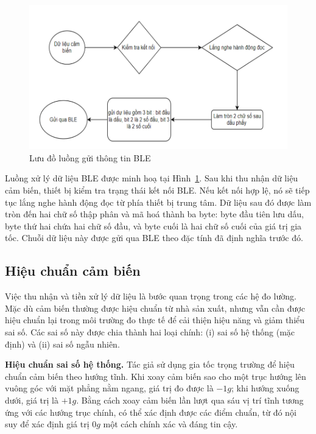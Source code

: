 \begin{figure}[htbp]
    \centering
    \includegraphics[width=\textwidth]{images/sendBleFlow.png}
    \caption{Lưu đồ luồng gửi thông tin BLE}
    \label{sendBleFlow}
\end{figure}


Luồng xử lý dữ liệu BLE được minh hoạ tại Hình~\ref{sendBleFlow}. 
Sau khi thu nhận dữ liệu cảm biến, thiết bị kiểm tra trạng thái 
kết nối BLE. Nếu kết nối hợp lệ, nó sẽ tiếp tục lắng nghe hành động đọc 
từ phía thiết bị trung tâm. Dữ liệu sau đó được làm tròn đến hai chữ số 
thập phân và mã hoá thành ba byte: byte đầu tiên lưu dấu, byte thứ hai 
chứa hai chữ số đầu, và byte cuối là hai chữ số cuối của giá trị gia tốc. 
Chuỗi dữ liệu này được gửi qua BLE theo đặc tính đã định nghĩa trước đó.














\subsection{Hiệu chuẩn cảm biến}
Việc thu nhận và tiền xử lý dữ liệu là bước quan trọng trong các hệ đo 
lường. Mặc dù cảm biến thường được hiệu chuẩn từ nhà sản xuất, nhưng 
vẫn cần được hiệu chuẩn lại trong môi trường đo thực tế để cải thiện 
hiệu năng và giảm thiểu sai số. Các sai số này được chia thành hai 
loại chính: (i) sai số hệ thống (mặc định) và (ii) sai số ngẫu nhiên.

\textbf{Hiệu chuẩn sai số hệ thống.} Tác giả sử dụng gia tốc trọng trường 
để hiệu chuẩn cảm biến theo hướng tĩnh. Khi xoay cảm biến sao cho một 
trục hướng lên vuông góc với mặt phẳng nằm ngang, giá trị đo được 
là $-1g$; khi hướng xuống dưới, giá trị là $+1g$. Bằng cách xoay cảm 
biến lần lượt qua sáu vị trí tĩnh tương ứng với các hướng trục chính, 
có thể xác định được các điểm chuẩn, từ đó nội suy để xác định giá 
trị $0g$ một cách chính xác và đáng tin cậy.

